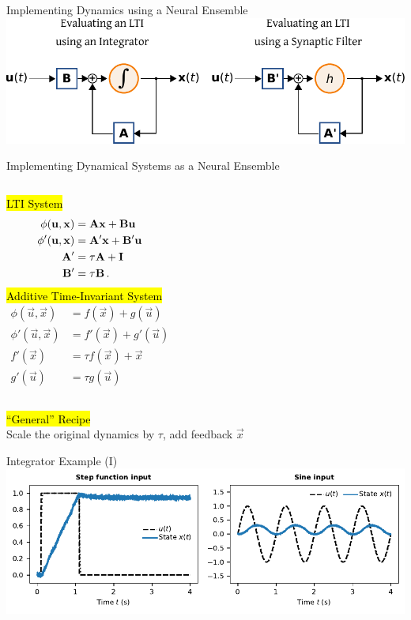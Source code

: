 \documentclass[handout,aspectratio=169]{beamer}
\begin{document}
	\begin{frame}{Implementing Dynamics using a Neural Ensemble}
		\centering
		\includegraphics[width=\textwidth]{media/lti_integrator_vs_neural.pdf} 
	\end{frame}

	\begin{frame}{Implementing Dynamical Systems as a Neural Ensemble}
		\begin{columns}[t]
			\centering
			\hl{LTI System}
			\begin{align*}
				\phi({\mathbf{u}}, {\mathbf{x}}) &= {\mathbf{A}} {\mathbf{x}} + {\mathbf{B}} {\mathbf{u}} \\
				\phi'({\mathbf{u}}, {\mathbf{x}}) &= {\mathbf{A}}' {\mathbf{x}} + {\mathbf{B}}' {\mathbf{u}} \\
				{\mathbf{A}}' &= \tau {\mathbf{A}} + {\mathbf{I}} \\ {\mathbf{B}}' &= \tau {\mathbf{B}} \,.
			\end{align*}
			\centering
			\hl{Additive Time-Invariant System}
			\begin{align*}
				\phi(\vec u, \vec x) &= f(\vec x) + g(\vec u) \\
				\phi'(\vec u, \vec x) &= f'(\vec x) + g'(\vec u) \\
				f'(\vec x) &= \tau f(\vec x) + \vec x \\
				g'(\vec u) &= \tau g(\vec u)
			\end{align*}
		\end{columns}
		\vspace{1cm}
		\centering \hl{\enquote{General} Recipe}\\[0.25cm]
		Scale the original dynamics by $\tau$, add feedback $\vec x$
	\end{frame}

	\begin{frame}{Integrator Example (I)}
		\centering
		\includegraphics[width=\textwidth]{media/example_integrator.pdf}
	\end{frame}
\end{document}
